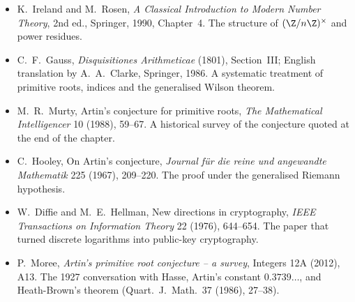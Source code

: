 \begin{itemize}
\item K.~Ireland and M.~Rosen, \emph{A Classical Introduction to Modern Number Theory}, 2nd ed., Springer, 1990, Chapter~4. The structure of $(\Z/n\Z)^\times$ and power residues.
\item C.~F.~Gauss, \emph{Disquisitiones Arithmeticae} (1801), Section~III; English translation by A.~A.~Clarke, Springer, 1986. A systematic treatment of primitive roots, indices and the generalised Wilson theorem.
\item M.~R.~Murty, Artin's conjecture for primitive roots, \emph{The Mathematical Intelligencer} 10 (1988), 59--67. A historical survey of the conjecture quoted at the end of the chapter.
\item C.~Hooley, On Artin's conjecture, \emph{Journal f\"ur die reine und angewandte Mathematik} 225 (1967), 209--220. The proof under the generalised Riemann hypothesis.
\item W.~Diffie and M.~E.~Hellman, New directions in cryptography, \emph{IEEE Transactions on Information Theory} 22 (1976), 644--654. The paper that turned discrete logarithms into public-key cryptography.
\item P.~Moree, \emph{Artin's primitive root conjecture -- a survey}, Integers 12A (2012), A13. The 1927 conversation with Hasse, Artin's constant $0.3739\ldots$, and Heath-Brown's theorem (Quart.\ J.\ Math.\ 37 (1986), 27--38).
\end{itemize}

